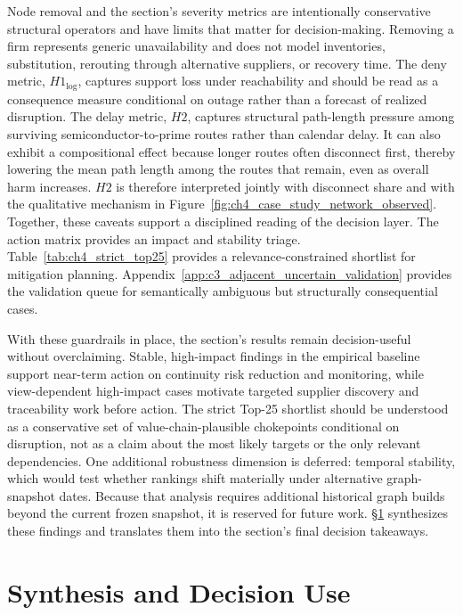 Node removal and the section's severity metrics are intentionally conservative structural operators and have limits that matter for decision-making. Removing a firm represents generic unavailability and does not model inventories, substitution, rerouting through alternative suppliers, or recovery time. The deny metric, $H1_{\log}$, captures support loss under reachability and should be read as a consequence measure conditional on outage rather than a forecast of realized disruption. The delay metric, $H2$, captures structural path-length pressure among surviving semiconductor-to-prime routes rather than calendar delay. It can also exhibit a compositional effect because longer routes often disconnect first, thereby lowering the mean path length among the routes that remain, even as overall harm increases. $H2$ is therefore interpreted jointly with disconnect share and with the qualitative mechanism in Figure~\ref{fig:ch4_case_study_network_observed}. Together, these caveats support a disciplined reading of the decision layer. The action matrix provides an impact and stability triage. Table~\ref{tab:ch4_strict_top25} provides a relevance-constrained shortlist for mitigation planning. Appendix~\ref{app:c3_adjacent_uncertain_validation} provides the validation queue for semantically ambiguous but structurally consequential cases.

With these guardrails in place, the section's results remain decision-useful without overclaiming. Stable, high-impact findings in the empirical baseline support near-term action on continuity risk reduction and monitoring, while view-dependent high-impact cases motivate targeted supplier discovery and traceability work before action. The strict Top-25 shortlist should be understood as a conservative set of value-chain-plausible chokepoints conditional on disruption, not as a claim about the most likely targets or the only relevant dependencies. One additional robustness dimension is deferred: temporal stability, which would test whether rankings shift materially under alternative graph-snapshot dates. Because that analysis requires additional historical graph builds beyond the current frozen snapshot, it is reserved for future work. \S\ref{sec:ch4_synthesis} synthesizes these findings and translates them into the section's final decision takeaways.

\section{Synthesis and Decision Use}
\label{sec:ch4_synthesis}

